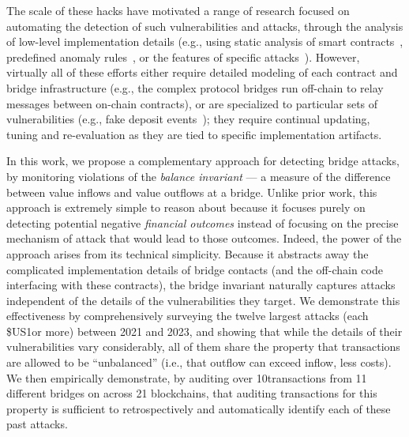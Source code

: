 The scale of these hacks have motivated a range of research
focused on automating the detection of such vulnerabilities and
attacks, through the analysis of low-level implementation details
(e.g., using static analysis of smart
contracts~\cite{wang2024xguard,liao2024smartaxe}, predefined anomaly
rules~\cite{zhang2022xscope}, or the features of specific
attacks~\cite{lin2024detecting}).  However, virtually all of these
efforts either require detailed modeling of each contract and bridge infrastructure (e.g.,
the complex protocol bridges run off-chain to relay messages between on-chain contracts),
or are specialized to particular sets of vulnerabilities (e.g., fake deposit events~\cite{lin2024detecting}); they require
continual updating, tuning and re-evaluation as they are tied to
specific implementation artifacts.

In this work, we propose a complementary approach for detecting bridge
attacks, by monitoring violations of the \emph{balance invariant}
--- a measure of the difference between value inflows and value
outflows at a bridge. Unlike prior work, this approach is extremely
simple to reason about because it focuses purely on detecting
potential negative \emph{financial outcomes} instead of focusing on
the precise mechanism of attack that would lead to those outcomes.
Indeed, the power of the approach arises from its technical
simplicity.  Because it abstracts away the complicated implementation
details of bridge contacts (and the off-chain code interfacing with these contracts), the bridge invariant naturally captures 
attacks independent of the details of the vulnerabilities
they target.  We demonstrate this effectiveness by comprehensively
surveying the twelve largest attacks (each \$US1\mil or more) between
2021 and 2023, and showing that while the details of their
vulnerabilities vary considerably, all of them share the property that
transactions are allowed to be ``unbalanced'' (i.e., that outflow can
exceed inflow, less costs).
We then empirically demonstrate, by auditing over 10\mil transactions from 11 different bridges on across 21 blockchains, that auditing transactions for this
property is sufficient to retrospectively and automatically identify
each of these past attacks.  

